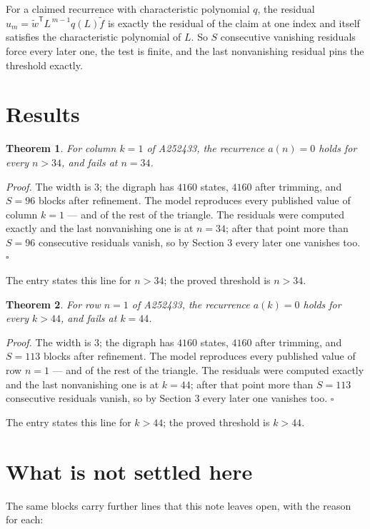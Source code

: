\documentclass[11pt]{article}
\newtheorem{theorem}{Theorem}
\theoremstyle{definition}
\begin{document}
For a claimed recurrence with characteristic polynomial $q$, the residual $u_m = \tilde w^{\mathsf T}L^{\,m-1}q(L)\tilde f$ is exactly the residual of the claim at one index and itself satisfies the characteristic polynomial of $L$. So $S$ consecutive vanishing residuals force every later one, the test is finite, and the last nonvanishing residual pins the threshold exactly.

\section{Results}

\begin{theorem} For column $k = 1$ of A252433, the recurrence $a(n) = 0$ holds for every $n > 34$, and fails at $n = 34$.\end{theorem}

{\itshape Proof.} The width is $3$; the digraph has $4160$ states, $4160$ after trimming, and $S = 96$ blocks after refinement. The model reproduces every published value of column $k = 1$ --- and of the rest of the triangle. The residuals were computed exactly and the last nonvanishing one is at $n = 34$; after that point more than $S = 96$ consecutive residuals vanish, so by Section 3 every later one vanishes too. $\square$

The entry states this line for $n > 34$; the proved threshold is $n > 34$.

\begin{theorem} For row $n = 1$ of A252433, the recurrence $a(k) = 0$ holds for every $k > 44$, and fails at $k = 44$.\end{theorem}

{\itshape Proof.} The width is $3$; the digraph has $4160$ states, $4160$ after trimming, and $S = 113$ blocks after refinement. The model reproduces every published value of row $n = 1$ --- and of the rest of the triangle. The residuals were computed exactly and the last nonvanishing one is at $k = 44$; after that point more than $S = 113$ consecutive residuals vanish, so by Section 3 every later one vanishes too. $\square$

The entry states this line for $k > 44$; the proved threshold is $k > 44$.

\section{What is not settled here}

The same blocks carry further lines that this note leaves open, with the reason for each:
\end{document}
